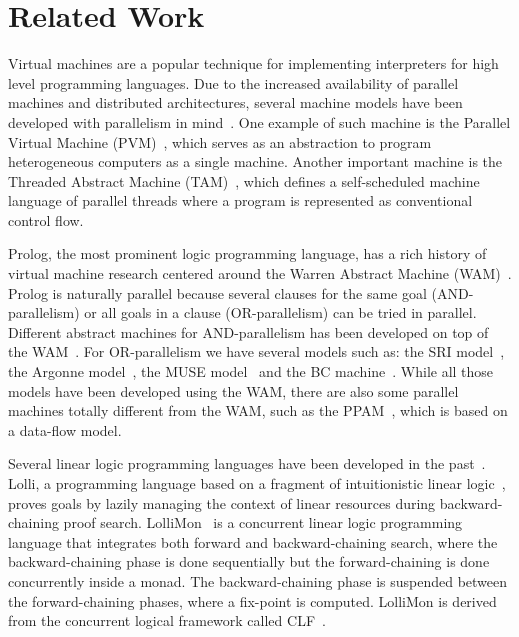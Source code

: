 \section{Related Work}
\label{related_work}

Virtual machines are a popular technique for implementing interpreters
for high level programming languages.  Due to the increased
availability of parallel machines and distributed architectures,
several machine models have been developed with parallelism in
mind~\cite{Kara:1997:AMM:265274}.  One example of such machine is the
Parallel Virtual Machine (PVM)~\cite{Sunderam90pvm:a}, which serves as
an abstraction to program heterogeneous computers as a single
machine. Another important machine is the Threaded Abstract Machine
(TAM)~\cite{CullerGSvE93,goldstein-tr94}, which defines a
self-scheduled machine language of parallel threads where a program is
represented as conventional control flow.

Prolog, the most prominent logic programming language, has a rich
history of virtual machine research centered around the Warren
Abstract Machine (WAM)~\cite{AICPub641:1983}. 
Prolog is naturally parallel because several clauses for the same goal
(AND-parallelism) or all goals in a clause (OR-parallelism) can be
tried in parallel. Different abstract machines for AND-parallelism has
been developed on top of the
WAM~\cite{Hermenegildo:1986:AMB:913061,Lin:1988:AEL:900478}.  For
OR-parallelism we have several models such as: the SRI
model~\cite{Warren:1987:OEM:67683.67699}, the Argonne
model~\cite{ButlerDLOOS88}, the MUSE model~\cite{Ali:1990fk} and the
BC machine~\cite{Ali88}. While all those models have been developed
using the WAM, there are also some parallel machines totally different
from the WAM, such as the PPAM~\cite{Kacsuk:1990:EMP:533578}, which is
based on a data-flow model.

Several linear logic programming languages have been developed in the past~\cite{Miller85anoverview}.
Lolli, a programming language based on a fragment of intuitionistic linear logic~\cite{Hodas94logicprogramming}, 
proves goals by lazily managing the context of linear resources during backward-chaining proof search.
LolliMon~\cite{Lopez:2005:MCL:1069774.1069778} is a concurrent linear logic programming language that integrates
both forward and backward-chaining search, where the backward-chaining phase is done sequentially but
the forward-chaining is done concurrently inside a monad. The backward-chaining phase is suspended
between the forward-chaining phases, where a fix-point is computed.
LolliMon is derived from the concurrent logical framework called CLF~\cite{Watkins:2004uq}.